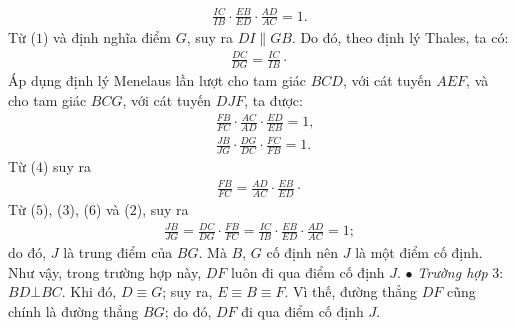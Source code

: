 \begin{multicols}{2}
\begin{align*}
		\frac{{IC}}{{IB}} \cdot \frac{{EB}}{{ED}} \cdot \frac{{AD}}{{AC}} = 1. \tag{$2$}
	\end{align*}
	Từ ($1$) và định nghĩa điểm $G$, suy ra $DI \parallel GB$. Do đó, theo định lý Thales, ta có:
	\begin{align*}
		\frac{{DC}}{{DG}} = \frac{{IC}}{{IB}} \cdot \tag{$3$}
	\end{align*}
	Áp dụng định lý Menelaus lần lượt cho tam giác $BCD$, với cát tuyến $AEF$, và cho tam giác $BCG$, với cát tuyến $DJF$, ta được:
	\begin{align*}
		&\frac{{FB}}{{FC}} \cdot \frac{{AC}}{{AD}} \cdot \frac{{ED}}{{EB}} = 1, \tag{$4$}\\
		&\frac{{JB}}{{JG}} \cdot \frac{{DG}}{{DC}} \cdot \frac{{FC}}{{FB}} = 1.\tag{$5$}
	\end{align*}
	Từ ($4$) suy ra
	\begin{align*}
		\frac{{FB}}{{FC}} = \frac{{AD}}{{AC}} \cdot \frac{{EB}}{{ED}} \cdot \tag{$6$}
	\end{align*}
	Từ ($5$), ($3$), ($6$) và ($2$), suy ra
	\begin{align*}
		\frac{{JB}}{{JG}} = \frac{{DC}}{{DG}} \cdot \frac{{FB}}{{FC}} = \frac{{IC}}{{IB}} \cdot \frac{{EB}}{{ED}} \cdot \frac{{AD}}{{AC}} = 1;
	\end{align*}
	do đó, $J$ là trung điểm của $BG$. Mà $B$, $G$ cố định nên $J$ là một điểm cố định.
	\vskip 0.05cm
	Như vậy, trong trường hợp này, $DF$ luôn đi qua điểm cố định $J$.
	\vskip 0.05cm
	$\bullet$ \textit{Trường hợp} $3$: $BD \bot BC$.
	\vskip 0.05cm
	Khi đó, $D \equiv G$; suy ra, $E \equiv B \equiv F$. Vì thế, đường thẳng $DF$ cũng chính là đường thẳng $BG$; do đó, $DF$ đi qua điểm cố định $J$.
	\begin{figure}[H]
		\centering
		\vspace*{-5pt}
		\captionsetup{labelformat= empty, justification=centering}

\end{figure}
\end{multicols}

